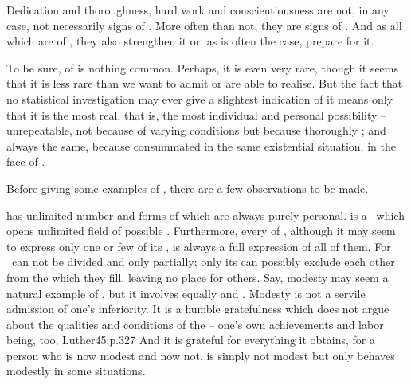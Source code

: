 Dedication and thoroughness, hard work and conscientiousness are not,
in any case, not necessarily signs of . More often than not,
they are signs of . And as all  which are 
of , they also strengthen it or, as is often the case, prepare for
it.  


To be sure,  of  is nothing
common. Perhaps, it is even very rare, though it seems that
it is less rare than we want to admit or are able to realise.  But the
fact that no statistical investigation may ever give a slightest
indication of it means only that it is the most real, that is, the
most individual and personal possibility -- unrepeatable, not because
of varying  conditions but because thoroughly
; and always the same, because consummated in the same
existential situation, in the face of .


\label{pa:inversion}
Before giving some examples of , there are a few
observations to be made.

\pa\label{pa:allaspects}  has unlimited number and forms of
 which are always purely personal.  is a 
\nexus\ which opens unlimited field of possible .
%
Furthermore, every  of , although it may
seem to express only one or few of its , is always a full expression
of all of them. For \nexus\ can not be divided and  only partially;
only its  can possibly exclude each other from the 
which they fill, leaving no place for others.  Say, modesty may seem a natural
example of , but it involves equally  and
. Modesty is not a servile admission of one's inferiority. It is a
humble gratefulness which does not argue about the qualities and conditions of
the  -- one's own achievements and labor being, too, \citet{nothing
  more than the finding and collecting of God's gifts.}{Luther}{45;p.327
  } And it is grateful for everything
it obtains, for a person who is now modest and now not, is simply not
modest but only behaves modestly in some situations.

